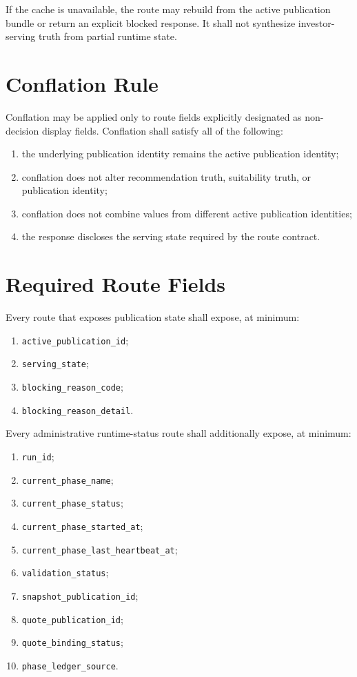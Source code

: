\documentclass[11pt]{report}
\begin{document}
If the cache is unavailable, the route may rebuild from the active publication bundle or return an explicit blocked response. It shall not synthesize investor-serving truth from partial runtime state.

\section{Conflation Rule}
Conflation may be applied only to route fields explicitly designated as non-decision display fields. Conflation shall satisfy all of the following:
\begin{enumerate}[leftmargin=1.2cm]
    \item the underlying publication identity remains the active publication identity;
    \item conflation does not alter recommendation truth, suitability truth, or publication identity;
    \item conflation does not combine values from different active publication identities;
    \item the response discloses the serving state required by the route contract.
\end{enumerate}

\section{Required Route Fields}
Every route that exposes publication state shall expose, at minimum:
\begin{enumerate}[leftmargin=1.2cm]
    \item \texttt{active\_publication\_id};
    \item \texttt{serving\_state};
    \item \texttt{blocking\_reason\_code};
    \item \texttt{blocking\_reason\_detail}.
\end{enumerate}

Every administrative runtime-status route shall additionally expose, at minimum:
\begin{enumerate}[leftmargin=1.2cm]
    \item \texttt{run\_id};
    \item \texttt{current\_phase\_name};
    \item \texttt{current\_phase\_status};
    \item \texttt{current\_phase\_started\_at};
    \item \texttt{current\_phase\_last\_heartbeat\_at};
    \item \texttt{validation\_status};
    \item \texttt{snapshot\_publication\_id};
    \item \texttt{quote\_publication\_id};
    \item \texttt{quote\_binding\_status};
    \item \texttt{phase\_ledger\_source}.
\end{enumerate}
\end{document}
